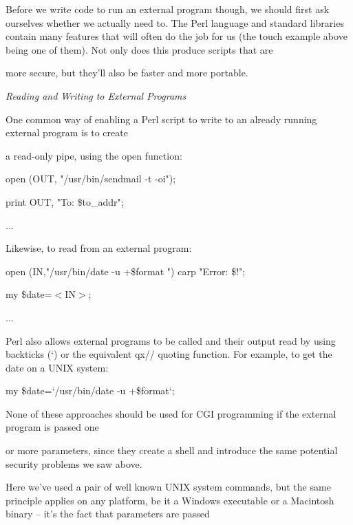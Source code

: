 \documentclass[a4paper,11pt]{book}
\begin{document}
\noindent 

\noindent Before we write code to run an external program though, we should first ask ourselves whether we actually need to. The Perl language and standard libraries contain many features that will often do the job for us (the touch example above being one of them). Not only does this produce scripts that are

\noindent more secure, but they'll also be faster and more portable.

\noindent 

\noindent 

\noindent \textit{Reading and Writing to External Programs}

\noindent One common way of enabling a Perl script to write to an already running external program is to create

\noindent a read-only pipe, using the open function:

\noindent 

\noindent open (OUT, "\textbar /usr/bin/sendmail -t -oi");

\noindent print OUT, "To: \$to\_addr";

\noindent ...

\noindent 

\noindent Likewise, to read from an external program:

\noindent 

\noindent open (IN,"/usr/bin/date -u +\$format \textbar ") \textbar \textbar  carp "Error: \$!";

\noindent my \$date=$<$IN$>$;

\noindent ...

\noindent 

\noindent Perl also allows external programs to be called and their output read by using backticks (`) or the equivalent qx// quoting function. For example, to get the date on a UNIX system:

\noindent 

\noindent my \$date=`/usr/bin/date -u +\$format`;

\noindent 

\noindent None of these approaches should be used for CGI programming if the external program is passed one

\noindent or more parameters, since they create a shell and introduce the same potential security problems we saw above.

\noindent 

\noindent Here we've used a pair of well known UNIX system commands, but the same principle applies on any platform, be it a Windows executable or a Macintosh binary -- it's the fact that parameters are passed
\end{document}
